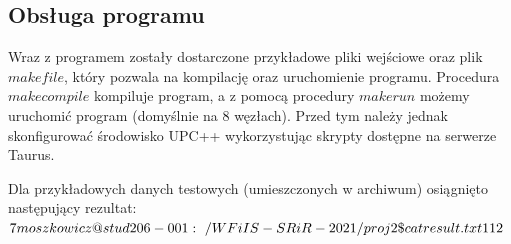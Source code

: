 \documentclass[a4paper,12pt]{article}
\begin{document}
\begin{justify}
\section{Obsługa programu}

Wraz z programem zostały dostarczone przykładowe pliki wejściowe oraz plik $makefile$, który pozwala na kompilację oraz uruchomienie programu. Procedura $make compile$ kompiluje program, a z pomocą procedury $make run$ możemy uruchomić program (domyślnie na 8 węzłach). Przed tym należy jednak skonfigurować środowisko UPC++ wykorzystując skrypty dostępne na serwerze Taurus.

Dla przykładowych danych testowych (umieszczonych w archiwum) osiągnięto następujący rezultat: \\
$
7moszkowicz@stud206-001:~/WFiIS-SRiR-2021/proj2\$ cat result.txt \\
1 \\
1 \\
2 \\
$

\end{justify}
\end{document}

